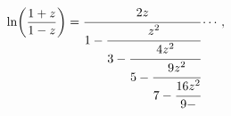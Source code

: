 \[\mathop{\ln\/}\nolimits\!\left(\frac{1+z}{1-z}\right)=\cfrac{2z}{1-\cfrac{z^{2%
}}{3-\cfrac{4z^{2}}{5-\cfrac{9z^{2}}{7-\cfrac{16z^{2}}{9-}}}}}\cdots,\]